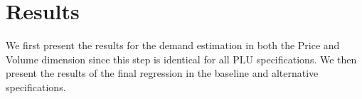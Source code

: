 %
%
%
%
%




\section{Results }
\label{resultsplusinterpret}
We first present the results for the demand estimation in both the Price and Volume dimension since this step is identical for all PLU specifications. We then present the results of the final regression in the baseline and alternative specifications. 

